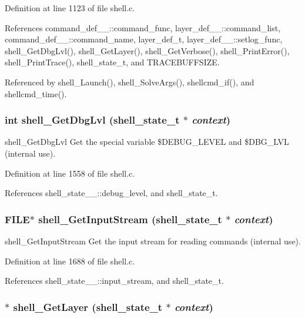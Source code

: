 Definition at line 1123 of file shell.c.

References command\_\-def\_\-\_\-::command\_\-func, layer\_\-def\_\-\_\-::command\_\-list, command\_\-def\_\-\_\-::command\_\-name, layer\_\-def\_\-t, layer\_\-def\_\-\_\-::setlog\_\-func, shell\_\-Get\-Dbg\-Lvl(), shell\_\-Get\-Layer(), shell\_\-Get\-Verbose(), shell\_\-Print\-Error(), shell\_\-Print\-Trace(), shell\_\-state\_\-t, and TRACEBUFFSIZE.

Referenced by shell\_\-Launch(), shell\_\-Solve\-Args(), shellcmd\_\-if(), and shellcmd\_\-time().
\subsubsection{\setlength{\rightskip}{0pt plus 5cm}int shell\_\-Get\-Dbg\-Lvl ({\bf shell\_\-state\_\-t} $\ast$ {\em context})}\label{shell_8c_a36}


shell\_\-Get\-Dbg\-Lvl Get the special variable \$DEBUG\_\-LEVEL and \$DBG\_\-LVL (internal use). 

Definition at line 1558 of file shell.c.

References shell\_\-state\_\-\_\-::debug\_\-level, and shell\_\-state\_\-t.
\subsubsection{\setlength{\rightskip}{0pt plus 5cm}FILE$\ast$ shell\_\-Get\-Input\-Stream ({\bf shell\_\-state\_\-t} $\ast$ {\em context})}\label{shell_8c_a38}


shell\_\-Get\-Input\-Stream Get the input stream for reading commands (internal use). 

Definition at line 1688 of file shell.c.

References shell\_\-state\_\-\_\-::input\_\-stream, and shell\_\-state\_\-t.
\subsubsection{$\ast$ shell\_\-Get\-Layer ({\bf shell\_\-state\_\-t} $\ast$ {\em context})}\label{shell_8c_a30}


